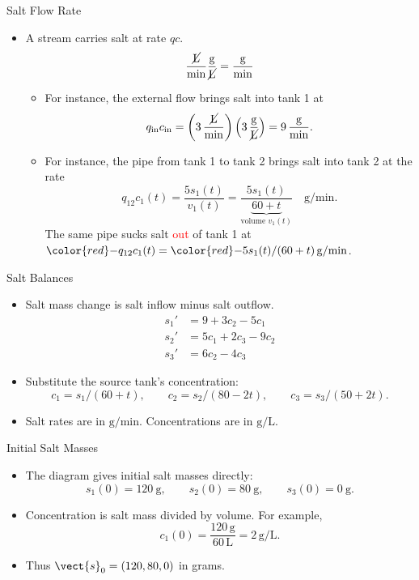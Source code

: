 \begin{frame}{Salt Flow Rate}
\begin{itemize}
  \item A stream carries salt at rate $qc$.
  \[
    \frac{\cancel{\mathrm L}}{\mathrm{min}}
    \frac{\mathrm g}{\cancel{\mathrm L}}=\frac{\mathrm g}{\mathrm{min}}
  \]
  \begin{itemize}
    \item For instance, the external flow brings salt into tank 1 at
    \[
      q_{\mathrm{in}}c_{\mathrm{in}}
      =\left(3\,\frac{\cancel{\mathrm L}}{\mathrm{min}}\right)
       \left(3\,\frac{\mathrm g}{\cancel{\mathrm L}}\right)
      =9\,\frac{\mathrm g}{\mathrm{min}}.
    \]
    \item For instance, the pipe from tank 1 to tank 2 brings salt into tank 2 at the rate
    \[
      q_{12}c_1(t)=\frac{5s_1(t)}{v_1(t)}
      =\frac{5s_1(t)}{\underbrace{60+t}_{\text{volume }v_1(t)}}
      \quad\mathrm{g/min}.
    \]
    The same pipe sucks salt \textcolor{red}{out} of tank 1 at 
    $ {\color{red}-}q_{12}c_1(t)={\color{red}-}5s_1(t)/(60+t)\,\mathrm{g/min}$.
  \end{itemize}
\end{itemize}
\end{frame}
\begin{frame}{Salt Balances}
\begin{itemize}
  \item Salt mass change is salt inflow minus salt outflow.
  \[
  \begin{aligned}
    s_1'&=9+3c_2-5c_1\\[4pt]
    s_2'&=5c_1+2c_3-9c_2\\[4pt]
    s_3'&=6c_2-4c_3
  \end{aligned}
  \]
  \item Substitute the source tank's concentration:
  \[
    c_1=s_1/(60+t),\qquad
    c_2=s_2/(80-2t),\qquad
    c_3=s_3/(50+2t).
  \]
  \item Salt rates are in $\mathrm{g/min}$. Concentrations are in $\mathrm{g/L}$.
\end{itemize}
\end{frame}

\begin{frame}{Initial Salt Masses}
\begin{itemize}
  \item The diagram gives initial salt masses directly:
  \[
    s_1(0)=120\ \mathrm g,\qquad s_2(0)=80\ \mathrm g,\qquad s_3(0)=0\ \mathrm g.
  \]
  \item Concentration is salt mass divided by volume. For example,
  \[
    c_1(0)=\frac{120\,\mathrm g}{60\,\mathrm L}=2\,\mathrm{g/L}.
  \]
  \item Thus $\vect{s}_0=(120,80,0)$ in grams.
\end{itemize}
\end{frame}

